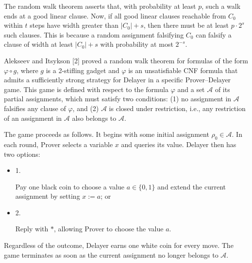 The random walk theorem asserts that, with probability at least $p$, such a walk ends at a good linear clause. Now, if all good linear clauses reachable from $C_{0}$ within $t$ steps have width greater than $|C_{0}|+s$, then there must be at least $p\cdot 2^{s}$ such clauses. This is because a random assignment falsifying $C_{0}$ can falsify a clause of width at least $|C_{0}|+s$ with probability at most $2^{-s}$.\par



Alekseev and Itsykson [2] proved a random walk theorem for formulas of the form $\varphi\circ g$, where $g$ is a 2-stifling gadget and $\varphi$ is an unsatisfiable CNF formula that admits a sufficiently strong strategy for Delayer in a specific Prover–Delayer game. This game is defined with respect to the formula $\varphi$ and a set $\mathcal{A}$ of its partial assignments, which must satisfy two conditions: (1) no assignment in $\mathcal{A}$ falsifies any clause of $\varphi$, and (2) $\mathcal{A}$ is closed under restriction, i.e., any restriction of an assignment in $\mathcal{A}$ also belongs to $\mathcal{A}$.\par



The game proceeds as follows. It begins with some initial assignment $\rho_{0}\in\mathcal{A}$. In each round, Prover selects a variable $x$ and queries its value. Delayer then has two options:\par


\begin{itemize}


\item 
1. 


Pay one black coin to choose a value $a\in\{0,1\}$ and extend the current assignment by setting $x:=a$; or\par





\item 
2. 


Reply with $*$, allowing Prover to choose the value $a$.\par





\end{itemize}


Regardless of the outcome, Delayer earns one white coin for every move. The game terminates as soon as the current assignment no longer belongs to $\mathcal{A}$.\par



